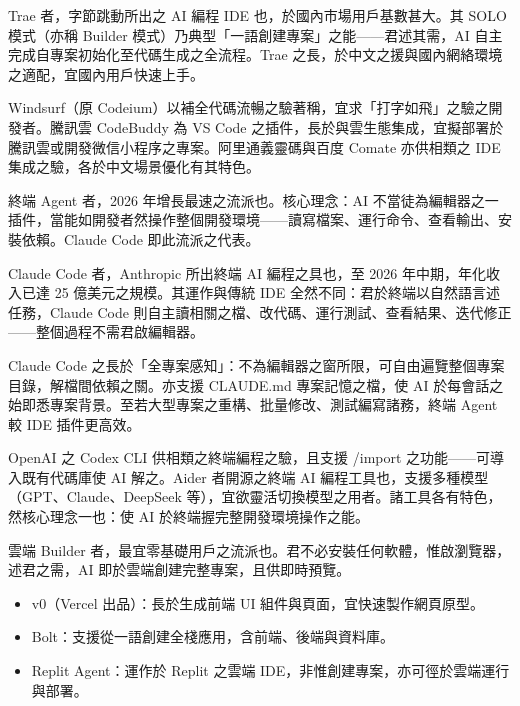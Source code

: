 
Trae 者，字節跳動所出之 AI 編程 IDE 也，於國內市場用戶基數甚大。其 SOLO 模式（亦稱 Builder 模式）乃典型「一語創建專案」之能——君述其需，AI 自主完成自專案初始化至代碼生成之全流程。Trae 之長，於中文之援與國內網絡環境之適配，宜國內用戶快速上手。


Windsurf（原 Codeium）以補全代碼流暢之驗著稱，宜求「打字如飛」之驗之開發者。騰訊雲 CodeBuddy 為 VS Code 之插件，長於與雲生態集成，宜擬部署於騰訊雲或開發微信小程序之專案。阿里通義靈碼與百度 Comate 亦供相類之 IDE 集成之驗，各於中文場景優化有其特色。


終端 Agent 者，2026 年增長最速之流派也。核心理念：AI 不當徒為編輯器之一插件，當能如開發者然操作整個開發環境——讀寫檔案、運行命令、查看輸出、安裝依賴。Claude Code 即此流派之代表。


Claude Code 者，Anthropic 所出終端 AI 編程之具也，至 2026 年中期，年化收入已達 25 億美元之規模。其運作與傳統 IDE 全然不同：君於終端以自然語言述任務，Claude Code 則自主讀相關之檔、改代碼、運行測試、查看結果、迭代修正——整個過程不需君啟編輯器。

Claude Code 之長於「全專案感知」：不為編輯器之窗所限，可自由遍覽整個專案目錄，解檔間依賴之關。亦支援 CLAUDE.md 專案記憶之檔，使 AI 於每會話之始即悉專案背景。至若大型專案之重構、批量修改、測試編寫諸務，終端 Agent 較 IDE 插件更高效。


OpenAI 之 Codex CLI 供相類之終端編程之驗，且支援 /import 之功能——可導入既有代碼庫使 AI 解之。Aider 者開源之終端 AI 編程工具也，支援多種模型（GPT、Claude、DeepSeek 等），宜欲靈活切換模型之用者。諸工具各有特色，然核心理念一也：使 AI 於終端握完整開發環境操作之能。


雲端 Builder 者，最宜零基礎用戶之流派也。君不必安裝任何軟體，惟啟瀏覽器，述君之需，AI 即於雲端創建完整專案，且供即時預覽。

\begin{itemize}
  \item v0（Vercel 出品）：長於生成前端 UI 組件與頁面，宜快速製作網頁原型。
  \item Bolt：支援從一語創建全棧應用，含前端、後端與資料庫。
  \item Replit Agent：運作於 Replit 之雲端 IDE，非惟創建專案，亦可徑於雲端運行與部署。
\end{itemize}

